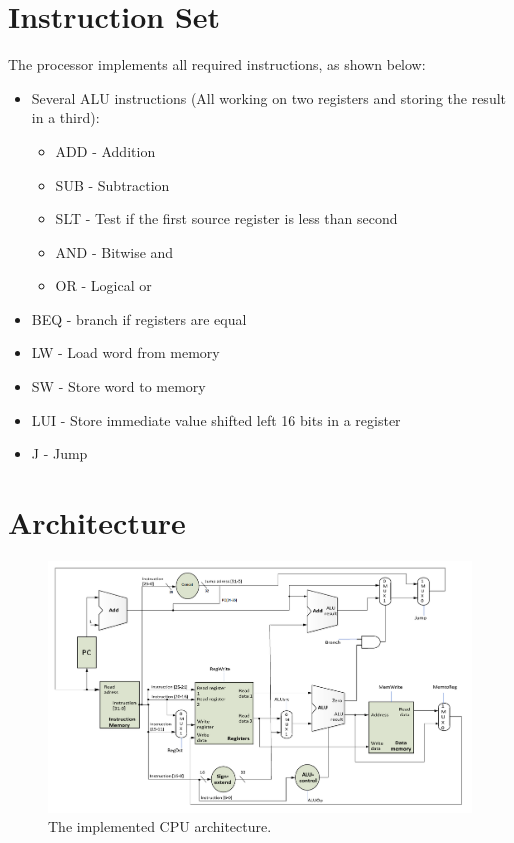\section{Instruction Set}

The processor implements all required instructions, as shown below:

\begin{itemize}
    \item Several ALU instructions (All working on two registers and storing the result in a third):
        \begin{itemize}
            \item ADD - Addition
            \item SUB - Subtraction
            \item SLT - Test if the first source register is less than second
            \item AND - Bitwise and
            \item OR  - Logical or
        \end{itemize}
    \item BEQ - branch if registers are equal
    \item LW - Load word from memory
    \item SW - Store word to memory
    \item LUI - Store immediate value shifted left 16 bits in a register
    \item J - Jump
\end{itemize}

\section{Architecture}

\begin{figure}[ht]
    \centering
    \includegraphics[scale=0.3]{figures/cpu.png}
    \caption{\label{fig:cpuArchitecture}The implemented CPU architecture.} 
\end{figure}

